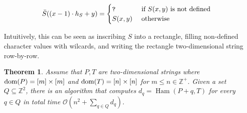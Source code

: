 \documentclass[11pt, letterpaper]{article}
\theoremstyle{plain}
\newtheorem{theorem}{Theorem}
\theoremstyle{definition}
\theoremstyle{remark}
\newcommand{\Z}{\mathbb{Z}}
\renewcommand{\O}{\mathcal{O}}
\DeclareMathOperator*{\Ham}{Ham}
\begin{document}
$$
\bar{S}((x-1) \cdot h_S + y) =
\begin{cases}
\texttt{?} & \text{ if } S(x,y) \text{ is not defined}\\
S(x,y) & \text{ otherwise}
\end{cases}
$$

Intuitively, this can be seen as inscribing $S$ into a rectangle, filling non-defined character values with wilcards, and writing the rectangle two-dimensional string row-by-row. 

\begin{theorem}\label{kangaroos}
Assume that $P, T$ are two-dimensional strings where $\operatorname*{dom}(P) = [m] \times [m]$ and $\operatorname*{dom}(T) = [n] \times [n]$ for $m \le n \in \Z^+$. Given a set $Q \subseteq \Z^2$, there is an algorithm that computes $d_q = \Ham(P + q, T) $ for every $q \in Q$ in total time $\O(n^2 + \sum_{q \in Q} d_q)$.
\end{theorem}
\end{document}
